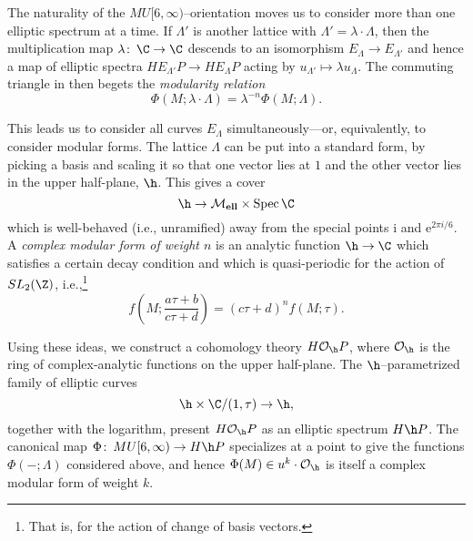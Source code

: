 \begin{example}
The naturality of the \(MU[6, \infty)\)--orientation moves us to consider more than one elliptic spectrum at a time.  If \(\Lambda'\) is another lattice with \(\Lambda' = \lambda \cdot \Lambda\), then the multiplication map \(\lambda\co \C \to \C\) descends to an isomorphism \(E_\Lambda \to E_{\Lambda'}\) and hence a map of elliptic spectra \(HE_{\Lambda'}P \to HE_\Lambda P\) acting by \(u_{\Lambda'} \mapsto \lambda u_\Lambda\).  The commuting triangle in  then begets the \textit{modularity relation} \[\Phi(M; \lambda \cdot \Lambda) = \lambda^{-n} \Phi(M; \Lambda).\]
\end{example}

\begin{example}\label{OrdinaryHomologyInUpperHalfPlaneEx}
This leads us to consider all curves \(E_\Lambda\) simultaneously---or, equivalently, to consider modular forms.  The lattice \(\Lambda\) can be put into a standard form, by picking a basis and scaling it so that one vector lies at \(1\) and the other vector lies in the upper half-plane, \(\h\).  This gives a cover \[\h \to \moduli{ell} \times \Spec \C\] which is well-behaved (i.e., unramified) away from the special points \(\mathrm i\) and \(\mathrm e^{2 \pi i / 6}\).  A \textit{complex modular form of weight \(n\)} is an analytic function \(\h \to \C\) which satisfies a certain decay condition and which is quasi-periodic for the action of \(SL_2(\Z)\), i.e.,\footnote{That is, for the action of change of basis vectors.} \[f\left(M; \frac{a \tau + b}{c \tau + d} \right) = (c \tau + d)^n f(M; \tau).\]

Using these ideas, we construct a cohomology theory \(H \sheaf O_{\h} P\), where \(\sheaf O_{\h}\) is the ring of complex-analytic functions on the upper half-plane.  The \(\h\)--parametrized family of elliptic curves \[\h \times \C / (1, \tau) \to \h,\] together with the logarithm, present \(H \sheaf O_{\h} P\) as an elliptic spectrum \(H\h P\).  The canonical map \(\Phi\co MU[6, \infty) \to H\h P\) specializes at a point to give the functions \(\Phi(-; \Lambda)\) considered above, and hence \(\Phi(M) \in u^k \cdot \sheaf O_{\h}\) is itself a complex modular form of weight \(k\).
\end{example}

